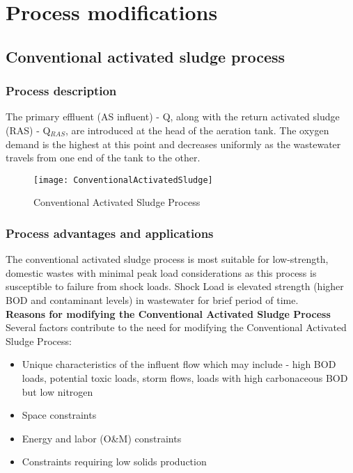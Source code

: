 		\section{Process modifications}
		\subsection{Conventional activated sludge process}

\subsubsection{Process description}
\noindent The primary effluent (AS influent) - Q, along with the return activated sludge (RAS) - Q$_{RAS}$, are introduced at the head of the aeration tank.  The oxygen demand is the highest at this point and decreases uniformly as the wastewater travels from one end of the tank to the other.\\  


\begin{figure}[h!]
\begin{center}
\texttt{[image: ConventionalActivatedSludge]}
\caption{Conventional Activated Sludge Process}
\end{center}
\end{figure}


\subsubsection{Process advantages and applications}
The conventional activated sludge process is most suitable for low-strength, domestic wastes with minimal peak load considerations as this process is susceptible to failure from shock loads.  Shock Load is elevated strength (higher BOD and contaminant levels) in wastewater for brief period of time.\\

\textbf{Reasons for modifying the Conventional Activated Sludge Process}\\
Several factors contribute to the need for modifying the Conventional Activated Sludge Process:
\begin{itemize}
\item Unique characteristics of the influent flow which may include - high BOD loads, potential toxic loads, storm flows, loads with high carbonaceous BOD but low nitrogen
\item Space constraints
\item Energy and labor (O\&M) constraints
\item Constraints requiring low solids production
\end{itemize}


